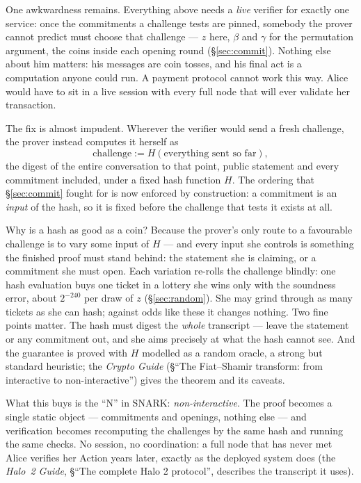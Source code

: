 \documentclass[11pt,a4paper]{article}
\theoremstyle{definition}
\begin{document}
One awkwardness remains. Everything above needs a \emph{live} verifier
for exactly one service: once the commitments a challenge tests are
pinned, somebody the prover cannot predict must choose that challenge
--- $z$ here, $\beta$ and $\gamma$ for the permutation argument, the
coins inside each opening round (\S\ref{sec:commit}). Nothing else about
him matters: his
messages are coin tosses, and his final act is a computation anyone could
run. A payment protocol cannot work this way. Alice would have to sit in
a live session with every full node that will ever validate her
transaction.

The fix is almost impudent. Wherever the verifier would send a fresh
challenge, the prover instead computes it herself as
\[
\text{challenge} := H(\text{everything sent so far}),
\]
the digest of the entire conversation to that point, public statement and
every commitment included, under a fixed hash function $H$. The ordering
that \S\ref{sec:commit} fought for is now enforced by construction: a
commitment is an \emph{input} of the hash, so it is fixed before the
challenge that tests it exists at all.

Why is a hash as good as a coin? Because the prover's only route to a
favourable challenge is to vary some input of $H$ --- and every input she
controls is something the finished proof must stand behind: the statement
she is claiming, or a commitment she must open. Each variation re-rolls
the challenge blindly: one hash evaluation buys one ticket in a lottery
she wins only with the soundness error, about $2^{-240}$ per draw of
$z$ (\S\ref{sec:random}). She may grind through as many
tickets as she can hash; against odds like these it changes nothing. Two
fine points matter. The hash must digest the \emph{whole} transcript ---
leave the statement or any commitment out, and she aims precisely at what
the hash cannot see. And the guarantee is proved with $H$ modelled as a
random oracle, a strong but standard heuristic; the \emph{Crypto Guide}
(\S``The Fiat--Shamir transform: from interactive to non-interactive'')
gives the theorem and its caveats.

What this buys is the ``N'' in SNARK: \emph{non-interactive}. The proof
becomes a single static object --- commitments and openings, nothing else
--- and verification becomes recomputing the challenges by the same hash
and running the same checks. No session, no coordination: a full node
that has never met Alice verifies her Action years later, exactly as the
deployed system does (the \emph{Halo~2 Guide}, \S``The complete Halo 2
protocol'', describes the transcript it uses).
\end{document}
